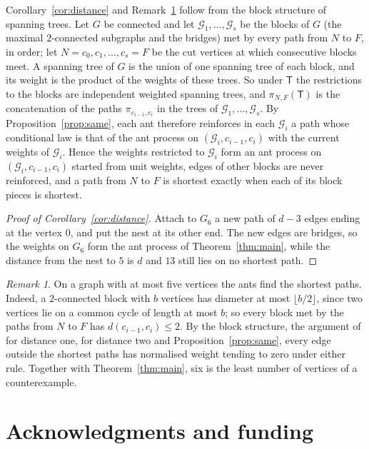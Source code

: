 \documentclass[11pt]{amsart}
\theoremstyle{remark}
\newtheorem{remark}[theorem]{Remark}
\begin{document}
Corollary~\ref{cor:distance} and Remark~\ref{rem:minimal} follow from the block structure of spanning trees. Let $G$ be connected and let $\mathcal G_1,\dots,\mathcal G_s$ be the blocks of $G$ (the maximal $2$-connected subgraphs and the bridges) met by every path from $N$ to $F$, in order; let $N=c_0,c_1,\dots,c_s=F$ be the cut vertices at which consecutive blocks meet. A spanning tree of $G$ is the union of one spanning tree of each block, and its weight is the product of the weights of these trees. So under $\mathsf T$ the restrictions to the blocks are independent weighted spanning trees, and $\pi_{N,F}(\mathsf T)$ is the concatenation of the paths $\pi_{c_{i-1},c_i}$ in the trees of $\mathcal G_1,\dots,\mathcal G_s$. By Proposition~\ref{prop:same}, each ant therefore reinforces in each $\mathcal G_i$ a path whose conditional law is that of the ant process on $(\mathcal G_i,c_{i-1},c_i)$ with the current weights of $\mathcal G_i$. Hence the weights restricted to $\mathcal G_i$ form an ant process on $(\mathcal G_i,c_{i-1},c_i)$ started from unit weights, edges of other blocks are never reinforced, and a path from $N$ to $F$ is shortest exactly when each of its block pieces is shortest.

\begin{proof}[Proof of Corollary~\ref{cor:distance}]
Attach to $G_6$ a new path of $d-3$ edges ending at the vertex $0$, and put the nest at its other end. The new edges are bridges, so the weights on $G_6$ form the ant process of Theorem~\ref{thm:main}, while the distance from the nest to $5$ is $d$ and $13$ still lies on no shortest path.
\end{proof}

\begin{remark}\label{rem:minimal}
On a graph with at most five vertices the ants find the shortest paths. Indeed, a $2$-connected block with $b$ vertices has diameter at most $\lfloor b/2\rfloor$, since two vertices lie on a common cycle of length at most $b$; so every block met by the paths from $N$ to $F$ has $d(c_{i-1},c_i)\le2$. By the block structure, the argument of \cite[Proposition~2.8]{KMS22b} for distance one, \cite[Theorem~1.1]{AM26} for distance two and Proposition~\ref{prop:same}, every edge outside the shortest paths has normalised weight tending to zero under either rule. Together with Theorem~\ref{thm:main}, six is the least number of vertices of a counterexample.
\end{remark}

\section*{Acknowledgments and funding}
\end{document}
